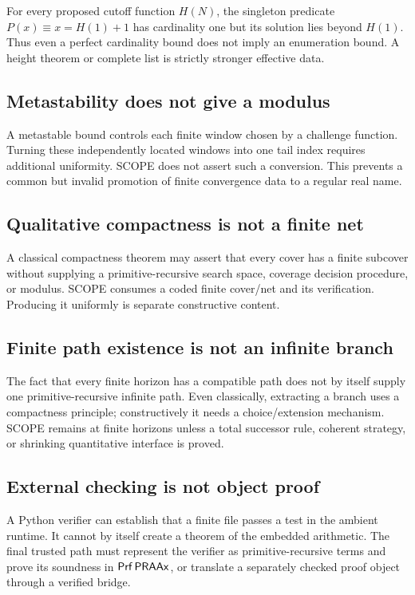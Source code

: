 For every proposed cutoff function \(H(N)\), the singleton predicate \(P(x)\equiv x=H(1)+1\) has cardinality one but its solution lies beyond \(H(1)\).  Thus even a perfect cardinality bound does not imply an enumeration bound.  A height theorem or complete list is strictly stronger effective data.

\subsection{Metastability does not give a modulus}

A metastable bound controls each finite window chosen by a challenge function.  Turning these independently located windows into one tail index requires additional uniformity.  SCOPE does not assert such a conversion.  This prevents a common but invalid promotion of finite convergence data to a regular real name.

\subsection{Qualitative compactness is not a finite net}

A classical compactness theorem may assert that every cover has a finite subcover without supplying a primitive-recursive search space, coverage decision procedure, or modulus.  SCOPE consumes a coded finite cover/net and its verification.  Producing it uniformly is separate constructive content.

\subsection{Finite path existence is not an infinite branch}

The fact that every finite horizon has a compatible path does not by itself supply one primitive-recursive infinite path.  Even classically, extracting a branch uses a compactness principle; constructively it needs a choice/extension mechanism.  SCOPE remains at finite horizons unless a total successor rule, coherent strategy, or shrinking quantitative interface is proved.

\subsection{External checking is not object proof}

A Python verifier can establish that a finite file passes a test in the ambient runtime.  It cannot by itself create a theorem of the embedded arithmetic.  The final trusted path must represent the verifier as primitive-recursive terms and prove its soundness in \(\mathsf{Prf}\,\mathsf{PRAAx}\), or translate a separately checked proof object through a verified bridge.

